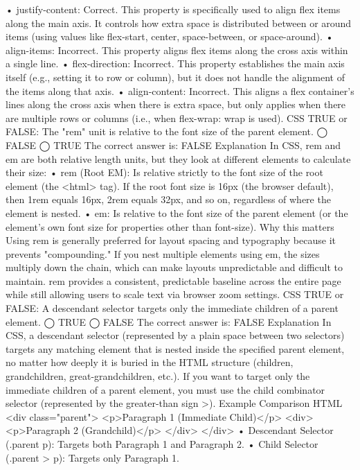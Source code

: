 •	justify-content: Correct. This property is specifically used to align flex items along the main axis. It controls how extra space is distributed between or around items (using values like flex-start, center, space-between, or space-around).
•	align-items: Incorrect. This property aligns flex items along the cross axis within a single line.
•	flex-direction: Incorrect. This property establishes the main axis itself (e.g., setting it to row or column), but it does not handle the alignment of the items along that axis.
•	align-content: Incorrect. This aligns a flex container's lines along the cross axis when there is extra space, but only applies when there are multiple rows or columns (i.e., when flex-wrap: wrap is used).
CSS
TRUE or FALSE: The "rem" unit is relative to the font size of the parent element.
◯ FALSE
◯ TRUE
The correct answer is:
FALSE
Explanation
In CSS, rem and em are both relative length units, but they look at different elements to calculate their size:
•	rem (Root EM): Is relative strictly to the font size of the root element (the <html> tag). If the root font size is 16px (the browser default), then 1rem equals 16px, 2rem equals 32px, and so on, regardless of where the element is nested.
•	em: Is relative to the font size of the parent element (or the element's own font size for properties other than font-size).
Why this matters
Using rem is generally preferred for layout spacing and typography because it prevents "compounding." If you nest multiple elements using em, the sizes multiply down the chain, which can make layouts unpredictable and difficult to maintain. rem provides a consistent, predictable baseline across the entire page while still allowing users to scale text via browser zoom settings.
CSS
TRUE or FALSE: A descendant selector targets only the immediate children of a parent element.
◯ TRUE
◯ FALSE
The correct answer is:
FALSE
Explanation
In CSS, a descendant selector (represented by a plain space between two selectors) targets any matching element that is nested inside the specified parent element, no matter how deeply it is buried in the HTML structure (children, grandchildren, great-grandchildren, etc.).
If you want to target only the immediate children of a parent element, you must use the child combinator selector (represented by the greater-than sign >).
Example Comparison
HTML
<div class="parent">
  <p>Paragraph 1 (Immediate Child)</p>
  <div>
    <p>Paragraph 2 (Grandchild)</p>
  </div>
</div>
•	Descendant Selector (.parent p): Targets both Paragraph 1 and Paragraph 2.
•	Child Selector (.parent > p): Targets only Paragraph 1.
